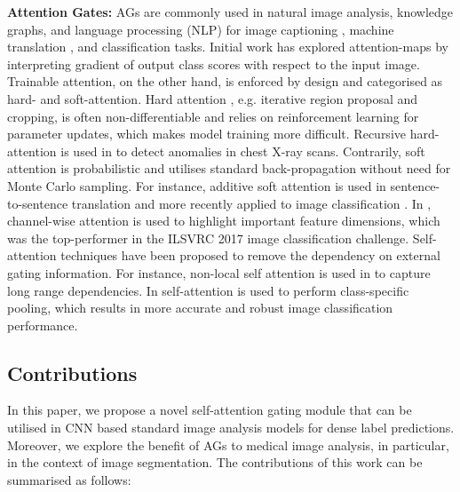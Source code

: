 \documentclass{article}
\begin{document}
\textbf{Attention Gates:} AGs are commonly used in natural image analysis, knowledge graphs, and language processing (NLP) for image captioning \cite{anderson2017bottom}, machine translation \cite{bahdanau2014neural, vaswani2017attention}, and classification \cite{jetley2018learn, velivckovic2017graph, wang2017residual} tasks. Initial work has explored attention-maps by interpreting gradient of output class scores with respect to the input image. Trainable attention, on the other hand, is enforced by design and categorised as hard- and soft-attention. Hard attention \cite{mnih2014recurrent}, e.g. iterative region proposal and cropping, is often non-differentiable and relies on reinforcement learning for parameter updates, which makes model training more difficult. Recursive hard-attention is used in \cite{ypsilantis2017learning} to detect anomalies in chest X-ray scans. Contrarily, soft attention is probabilistic and utilises standard back-propagation without need for Monte Carlo sampling. For instance, additive soft attention is used in sentence-to-sentence translation \cite{bahdanau2014neural, shen2017disan} and more recently applied to image classification \cite{jetley2018learn, wang2017residual}. In \cite{hu2017squeeze}, channel-wise attention is used to highlight important feature dimensions, which was the top-performer in the ILSVRC 2017 image classification challenge. Self-attention techniques \cite{jetley2018learn,wang2017non} have been proposed to remove the dependency on external gating information. For instance, non-local self attention is used in \cite{wang2017non} to capture long range dependencies. In \cite{jetley2018learn, wang2017residual} self-attention is used to perform class-specific pooling, which results in more accurate and robust image classification performance.  

\vspace{-1.0 mm}
\subsection{Contributions} In this paper, we propose a novel self-attention gating module that can be utilised in CNN based standard image analysis models for dense label predictions. Moreover, we explore the benefit of AGs to medical image analysis, in particular, in the context of image segmentation. The contributions of this work can be summarised as follows:
\end{document}
